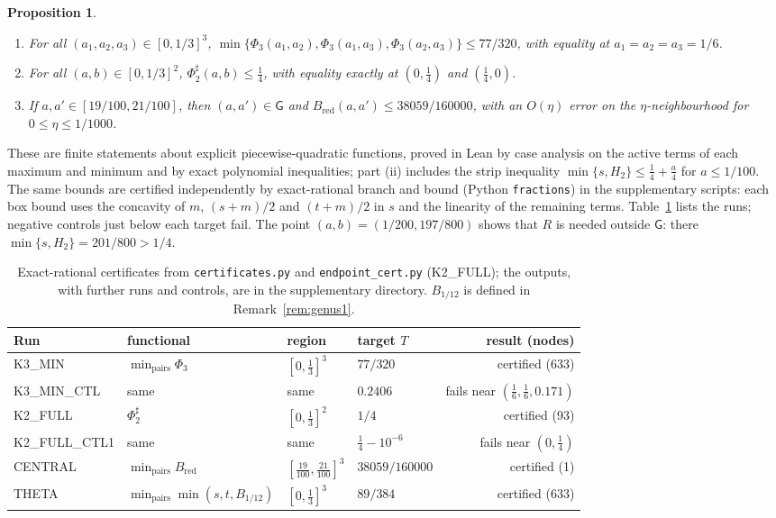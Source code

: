 \documentclass[11pt,reqno]{amsart}
\newtheorem{proposition}[theorem]{Proposition}
\theoremstyle{definition}
\theoremstyle{remark}
\numberwithin{equation}{section}
\newcommand{\Bred}{B_{\mathrm{red}}}
\begin{document}
\begin{proposition}\label{prop:certs}
\begin{enumerate}[label=\textup{(\roman*)}]
\item For all $(a_1,a_2,a_3)\in[0,1/3]^3$,
$\min\{\Phi_3(a_1,a_2),\Phi_3(a_1,a_3),\Phi_3(a_2,a_3)\}\le 77/320$, with
equality at $a_1=a_2=a_3=1/6$.
\item For all $(a,b)\in[0,1/3]^2$, $\Phi_2^\sharp(a,b)\le\frac14$, with equality
exactly at $(0,\frac14)$ and $(\frac14,0)$.
\item If $a,a'\in[19/100,21/100]$, then $(a,a')\in\mathsf G$ and
$\Bred(a,a')\le 38059/160000$, with an $O(\eta)$ error on the
$\eta$-neighbourhood for $0\le\eta\le1/1000$.
\end{enumerate}
\end{proposition}
These are finite statements about explicit piecewise-quadratic functions, proved
in Lean by case analysis on the active terms of each maximum and minimum and by
exact polynomial inequalities; part (ii) includes the strip inequality
$\min\{s,H_2\}\le\frac14+\frac a4$ for $a\le1/100$. The same bounds are certified independently by exact-rational branch and
bound (Python \texttt{fractions}) in the supplementary scripts: each box bound
uses the concavity of $m$, $(s+m)/2$ and $(t+m)/2$ in $s$ and the linearity of
the remaining terms. Table~\ref{tab:cert} lists the runs; negative controls
just below each target fail. The point $(a,b)=(1/200,197/800)$
shows that $R$ is needed outside $\mathsf G$: there $\min\{s,H_2\}=201/800>1/4$.

\begin{table}[ht]
\centering
\footnotesize
\begin{tabular}{@{}llllr@{}}
\toprule
Run & functional & region & target $T$ & result (nodes)\\
\midrule
K3\_MIN & $\min_{\mathrm{pairs}}\Phi_3$ & $[0,\frac13]^3$ & $77/320$ & certified (633)\\
K3\_MIN\_CTL & same & same & $0.2406$ & fails near $(\frac16,\frac16,0.171)$\\
K2\_FULL & $\Phi_2^\sharp$ & $[0,\frac13]^2$ & $1/4$ & certified (93)\\
K2\_FULL\_CTL1 & same & same & $\frac14-10^{-6}$ & fails near $(0,\frac14)$\\
CENTRAL & $\min_{\mathrm{pairs}}\Bred$ & $[\frac{19}{100},\frac{21}{100}]^3$ & $38059/160000$ & certified (1)\\
THETA & $\min_{\mathrm{pairs}}\min(s,t,B_{1/12})$ & $[0,\frac13]^3$ & $89/384$ & certified (633)\\
\bottomrule
\end{tabular}
\caption{Exact-rational certificates from \texttt{certificates.py} and
\texttt{endpoint\_cert.py} (K2\_FULL); the outputs, with further runs and
controls, are in the supplementary directory. $B_{1/12}$ is defined in
Remark~\ref{rem:genus1}.}\label{tab:cert}
\end{table}
\end{document}
